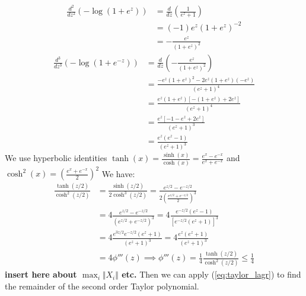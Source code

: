 \documentclass{article}
\theoremstyle{definition}
\begin{document}
\begin{equation*}
    \begin{split}
        \frac{d^2}{dz^2}\left(-\log\left(1 + e^z \right)\right) 
        & = \frac{d}{dz} \left(\frac{1}{e^z +1}\right) \\
        & = \left(-1\right)e^z \left(1 + e^z\right)^{-2} \\
        & = -\frac{e^z}{\left(1 + e^z\right)^2} 
\end{split} 
\end{equation*}
\begin{equation*}
\begin{split}
    \frac{d^3}{dz^3}\left( -\log\left(1 + e^{-z}\right)\right) &= \frac{d}{dz}\left( - \frac{e^z}{\left(1 + e^z\right)^2}\right) \\
    & = \frac{- e^z \left(1 + e^z\right)^2 - 2e^z\left(1 + e^z\right)\left(-e^z\right)}{\left(e^z + 1\right)^4}\\
    &=\frac{e^z\left(1+e^z\right)\left[-\left(1 + e^z\right) + 2e^z\right]}{\left(e^z + 1\right)^4} \\
    &= \frac{e^z\left[-1 -e^z + 2e^z\right]}{\left(e^z + 1\right)^3} \\
    &= \frac{e^z \left(e^z -1\right)}{\left(e^z + 1 \right)^3}
\end{split}
\end{equation*}
We use hyperbolic identities $\tanh(x) = \frac{\sinh(x)}{\cosh(x)} = \frac{e^x - e^{-x}}{e^x + e^{-x}}$ and $\cosh^2(x) = \left(\frac{e^x + e^{-x}}{2}\right)^2$
We have: 
\begin{equation*}
\begin{split}
\frac{\tanh(z/2)}{\cosh^2(z/2)}  &= \frac{\sinh(z/2)}{2\cosh^3(z/2)} 
= \frac{e^{z/2} - e^{-z/2}}{2\left(\frac{e^{z/2} + e^{-z/2}}{2}\right)^3} \\
& = 4\frac{e^{z/2} - e^{-z/2}}{\left(e^{z/2} + e^{-z/2}\right)^3}
 = 4\frac{e^{-z/2}\left(e^z -1\right)}{\left[e^{-z/2}\left(e^z + 1\right)\right]^3} \\
& = 4\frac{e^{3z/2}e^{-z/2}\left(e^z+1\right)}{\left(e^z + 1\right)^3} 
 = 4 \frac{e^z\left(e^z + 1\right)}{\left(e^z +1 \right)^3} \\
& = 4\phi'''(z) 
\implies \phi'''(z) = \frac{1}{4}\frac{\tanh(z/2)}{\cosh^2(z/2)} \leq \frac{1}{4}
\end{split}
\end{equation*}
\textbf{insert here about $\max_i \Vert X_i \Vert$ etc. }
Then we can apply (\ref{eq:taylor_lagr}) to find the remainder of the second order Taylor polynomial. 
\end{document}
